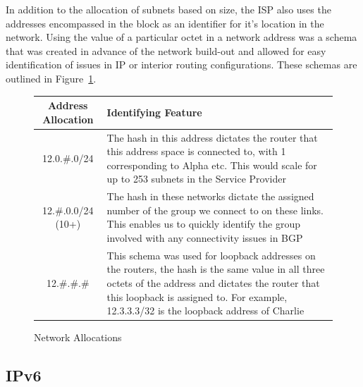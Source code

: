 In addition to the allocation of subnets based on size, the ISP also uses the
addresses encompassed in the block as an identifier for it's location in the
network. Using the value of a particular octet in a network address was a schema
that was created in advance of the network build-out and allowed for easy
identification of issues in IP or interior routing configurations. These schemas
are outlined in Figure~\ref{figure:network-alloc-2}.
\FloatBarrier
\begin{figure}[h!]
	\caption{Network Allocations}
	\label{figure:network-alloc-2}
	\centering
	\begin{tabular}{|c|p{8cm}|}
		\hline \textbf{Address Allocation} & \textbf{Identifying Feature} \\
		\hline 12.0.\#.0/24 & The hash in this address dictates the router that this address space is connected to, with 1 corresponding to Alpha etc. This would scale for up to 253 subnets in the Service Provider \\
		\hline 12.\#.0.0/24 (10+) & The hash in these networks dictate the assigned number of the group we connect to on these links. This enables us to quickly identify the group involved with any connectivity issues in BGP  \\
		\hline 12.\#.\#.\# & This schema was used for loopback addresses on the routers, the hash is the same value in all three octets of the address and dictates the router that this loopback is assigned to. For example, 12.3.3.3/32 is the loopback address of Charlie \\
		\hline
	\end{tabular}
\end{figure}
\FloatBarrier

\subsection{IPv6}